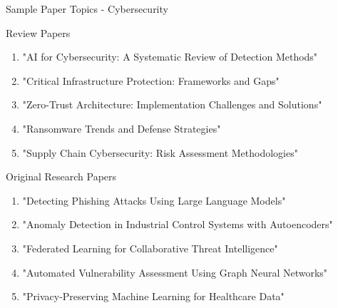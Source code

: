 \documentclass[11pt]{beamer}
\begin{document}
	\begin{frame}{Sample Paper Topics - Cybersecurity}
		\scriptsize
		\begin{block}{Review Papers}
			\begin{enumerate}
				\item "AI for Cybersecurity: A Systematic Review of Detection Methods"
				\item "Critical Infrastructure Protection: Frameworks and Gaps"
				\item "Zero-Trust Architecture: Implementation Challenges and Solutions"
				\item "Ransomware Trends and Defense Strategies"
				\item "Supply Chain Cybersecurity: Risk Assessment Methodologies"
			\end{enumerate}
		\end{block}
		\begin{block}{Original Research Papers}
			\begin{enumerate}
				\item "Detecting Phishing Attacks Using Large Language Models"
				\item "Anomaly Detection in Industrial Control Systems with Autoencoders"
				\item "Federated Learning for Collaborative Threat Intelligence"
				\item "Automated Vulnerability Assessment Using Graph Neural Networks"
				\item "Privacy-Preserving Machine Learning for Healthcare Data"
			\end{enumerate}
		\end{block}
	\end{frame}
	
\end{document}
